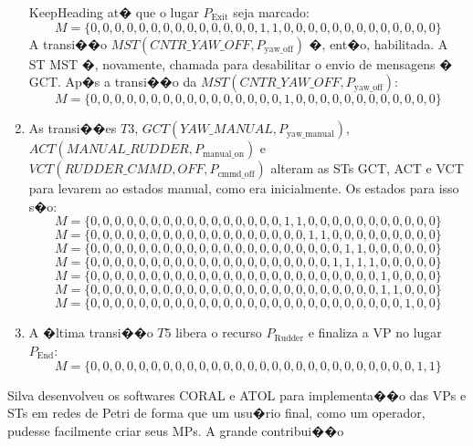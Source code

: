 \begin{enumerate}
  KeepHeading at� que o lugar $P_{\textrm{Exit}}$ seja marcado:
$$M
=\{0,0,0,0,0,0,0,0,0,0,0,0,0,0,1,1,0,0,0,0,0,0,0,0,0,0,0,0,0\}$$
A transi��o $MST(CNTR\_YAW\_OFF,P_{\textrm{yaw\_off}})$ �, ent�o, habilitada. A
ST MST �, novamente, chamada para desabilitar o envio de mensagens � GCT. Ap�s a
transi��o da $MST(CNTR\_YAW\_OFF,P_{\textrm{yaw\_off}})$:
$$M
=\{0,0,0,0,0,0,0,0,0,0,0,0,0,0,0,0,1,0,0,0,0,0,0,0,0,0,0,0,0\}$$
  \item As transi��es $T3$, $GCT(YAW\_MANUAL,P_{\textrm{yaw\_manual}})$,
  $ACT(MANUAL\_RUDDER,P_{\textrm{manual\_on}})$ e
  $VCT(RUDDER\_CMMD,OFF,P_{\textrm{cmmd\_off}})$ alteram as STs GCT, ACT e VCT
  para levarem ao estados manual, como era inicialmente. Os estados para isso
  s�o:
$$M
=\{0,0,0,0,0,0,0,0,0,0,0,0,0,0,0,0,1,1,0,0,0,0,0,0,0,0,0,0,0\}$$
$$M
=\{0,0,0,0,0,0,0,0,0,0,0,0,0,0,0,0,0,0,1,1,0,0,0,0,0,0,0,0,0\}$$
$$M
=\{0,0,0,0,0,0,0,0,0,0,0,0,0,0,0,0,0,0,0,0,0,1,1,0,0,0,0,0,0\}$$
$$M
=\{0,0,0,0,0,0,0,0,0,0,0,0,0,0,0,0,0,0,0,0,1,1,1,1,0,0,0,0,0\}$$
$$M
=\{0,0,0,0,0,0,0,0,0,0,0,0,0,0,0,0,0,0,0,0,0,0,0,0,1,0,0,0,0\}$$
$$M
=\{0,0,0,0,0,0,0,0,0,0,0,0,0,0,0,0,0,0,0,0,0,0,0,0,1,1,0,0,0\}$$
$$M
=\{0,0,0,0,0,0,0,0,0,0,0,0,0,0,0,0,0,0,0,0,0,0,0,0,0,0,1,0,0\}$$  
  \item A �ltima transi��o $T5$ libera o recurso $P_{\textrm{Rudder}}$ e
  finaliza a VP no lugar $P_{\textrm{End}}$:
$$M
=\{0,0,0,0,0,0,0,0,0,0,0,0,0,0,0,0,0,0,0,0,0,0,0,0,0,0,0,1,1\}$$
\end{enumerate} 

Silva desenvolveu os softwares CORAL e ATOL para implementa��o das VPs e STs em
redes de Petri de forma que um usu�rio final, como um operador, pudesse
facilmente criar seus MPs. A grande contribui��o 



